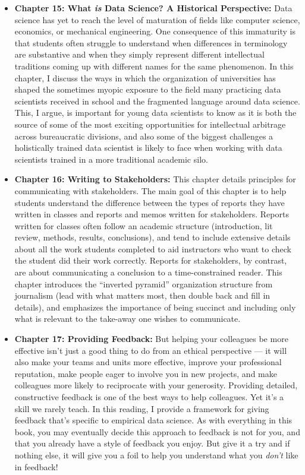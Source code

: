 \documentclass[12pt]{article}
\begin{document}
\begin{itemize}

\item
  \textbf{Chapter 15: What \emph{is} Data Science? A Historical
  Perspective:} Data science has yet to reach the level of maturation of
  fields like computer science, economics, or mechanical engineering.
  One consequence of this immaturity is that students often struggle to
  understand when differences in terminology are substantive and when
  they simply represent different intellectual traditions coming up with
  different names for the same phenomenon. In this chapter, I discuss
  the ways in which the organization of universities has shaped the
  sometimes myopic exposure to the field many practicing data scientists
  received in school and the fragmented language around data science.
  This, I argue, is important for young data scientists to know as it is
  both the source of some of the most exciting opportunities for
  intellectual arbitrage across bureaucratic divisions, and also some of
  the biggest challenges a holistically trained data scientist is likely
  to face when working with data scientists trained in a more
  traditional academic silo.
\item
  \textbf{Chapter 16: Writing to Stakeholders:} This chapter details
  principles for communicating with stakeholders. The main goal of this
  chapter is to help students understand the difference between the
  types of reports they have written in classes and reports and memos
  written for stakeholders. Reports written for classes often follow an
  academic structure (introduction, lit review, methods, results,
  conclusions), and tend to include extensive details about all the work
  students completed to aid instructors who want to check the student
  did their work correctly. Reports for stakeholders, by contrast, are
  about communicating a conclusion to a time-constrained reader. This
  chapter introduces the ``inverted pyramid'' organization structure
  from journalism (lead with what matters most, then double back and
  fill in details), and emphasizes the importance of being succinct and
  including only what is relevant to the take-away one wishes to
  communicate.
\item
  \textbf{Chapter 17: Providing Feedback:} But helping your colleagues
  be more effective isn't just a good thing to do from an ethical
  perspective --- it will also make your teams and units more effective,
  improve your professional reputation, make people eager to involve you
  in new projects, and make colleagues more likely to reciprocate with
  your generosity. Providing detailed, constructive feedback is one of
  the best ways to help colleagues. Yet it's a skill we rarely teach. In
  this reading, I provide a framework for giving feedback that's
  specific to empirical data science. As with everything in this book,
  you may eventually decide this approach to feedback is not for you,
  and that you already have a style of feedback you enjoy. But give it a
  try and if nothing else, it will give you a foil to help you
  understand what you \emph{don't} like in feedback!
\end{itemize}
\end{document}
